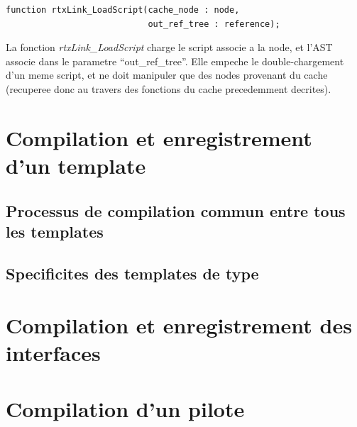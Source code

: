\documentclass[french]{rtxreport}
\begin{document}
\begin{lstlisting}
function rtxLink_LoadScript(cache_node : node,
                            out_ref_tree : reference);
\end{lstlisting}
La fonction \emph{rtxLink\_LoadScript} charge le script associe a la node, et
l'AST associe dans le parametre ``out\_ref\_tree''. Elle empeche le
double-chargement d'un meme script, et ne doit manipuler que des nodes
provenant du cache (recuperee donc au travers des fonctions du cache
precedemment decrites).



\section{Compilation et enregistrement d'un template}
\subsection{Processus de compilation commun entre tous les templates}
\subsection{Specificites des templates de type}

\section{Compilation et enregistrement des interfaces}


\section{Compilation d'un pilote}
\end{document}
